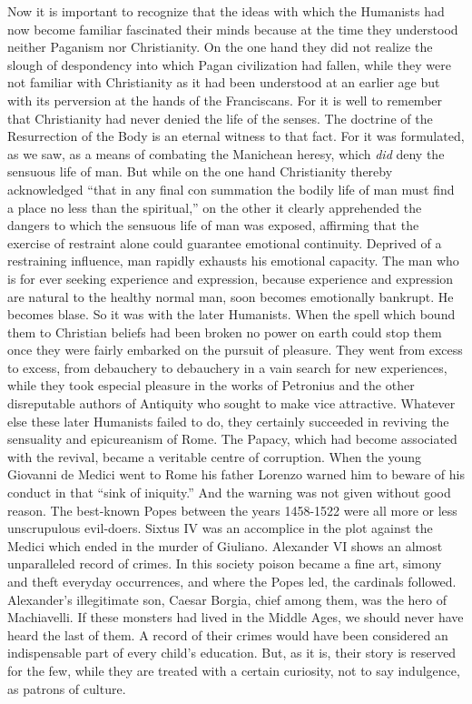 \documentclass{book}
\begin{document}
Now it is important to recognize that the ideas with which the Humanists had now become familiar fascinated their minds because at the time they understood neither Paganism nor Christianity. On the one hand they did not realize the slough of despondency into which Pagan civilization had fallen, while they were not familiar with Christianity as it had been understood at an earlier age but with its perversion at the hands of the Franciscans. For it is well to remember that Christianity had never denied the life of the senses. The doctrine of the Resurrection of the Body is an eternal witness to that fact. For it was formulated, as we saw, as a means of combating the Manichean heresy, which \emph{did} deny the sensuous life of man. But while on the one hand Christianity thereby acknowledged “that in any final con summation the bodily life of man must find a place no less than the spiritual,” on the other it clearly apprehended the dangers to which the sensuous life of man was exposed, affirming that the exercise of restraint alone could guarantee emotional continuity. Deprived of a restraining influence, man rapidly exhausts his emotional capacity. The man who is for ever seeking experience and expression, because experience and expression are natural to the healthy normal man, soon becomes emotionally bankrupt. He becomes blase. So it was with the later Humanists. When the spell which bound them to Christian beliefs had been broken no power on earth could stop them once they were fairly embarked on the pursuit of pleasure. They went from excess to excess, from debauchery to debauchery in a vain search for new experiences, while they took especial pleasure in the works of Petronius and the other disreputable authors of Antiquity who sought to make vice attractive. Whatever else these later Humanists failed to do, they certainly succeeded in reviving the sensuality and epicureanism of Rome. The Papacy, which had become associated with the revival, became a veritable centre of corruption. When the young Giovanni de Medici went to Rome his father Lorenzo warned him to beware of his conduct in that “sink of iniquity.” And the warning was not given without good reason. The best-known Popes between the years 1458-1522 were all more or less unscrupulous evil-doers. Sixtus IV was an accomplice in the plot against the Medici which ended in the murder of Giuliano. Alexander VI shows an almost unparalleled record of crimes. In this society poison became a fine art, simony and theft everyday occurrences, and where the Popes led, the cardinals followed. Alexander’s illegitimate son, Caesar Borgia, chief among them, was the hero of Machiavelli. If these monsters had lived in the Middle Ages, we should never have heard the last of them. A record of their crimes would have been considered an indispensable part of every child’s education. But, as it is, their story is reserved for the few, while they are treated with a certain curiosity, not to say indulgence, as patrons of culture.
\end{document}
